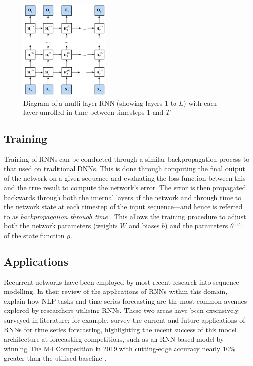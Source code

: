 \documentclass[a4paper, 11pt]{report}
\begin{document}
    \begin{figure}[ht]
        \centering
        \includegraphics[width=0.4\textwidth]{deep-rnn.png}
        \caption{\centering Diagram of a multi-layer RNN (showing layers $1$ to $L$) with each layer unrolled in time between timesteps $1$ and $T$ \citep{zhang-2021}}
        \label{fig: deep-rnn}
    \end{figure}


    \subsection{Training}

    Training of RNNs can be conducted through a similar backpropagation process to that used on traditional DNNs. This is done through computing the final output of the network on a given sequence and evaluating the loss function between this and the true result to compute the network's error. The error is then propagated backwards through both the internal layers of the network and through time to the network state at each timestep of the input sequence---and hence is referred to as \emph{backpropagation through time} \citep{zhang-2021}. This allows the training procedure to adjust both the network parameters (weights $W$ and biases $b$) and the parameters $\theta^{(g)}$ of the state function $g$.


    \subsection{Applications}

    Recurrent networks have been employed by most recent research into sequence modelling. In their review of the applications of RNNs within this domain, \citet{lipton-2015} explain how NLP tasks and time-series forecasting are the most common avenues explored by researchers utilising RNNs. These two areas have been extensively surveyed in literature; for example, \citet{hewamalage-2021} survey the current and future applications of RNNs for time series forecasting, highlighting the recent success of this model architecture at forecasting competitions, such as an RNN-based model by \citet{smyl-2020} winning The M4 Competition in 2019 with cutting-edge accuracy nearly $10\%$ greater than the utilised baseline \citep{makridakis-2020}.
\end{document}
